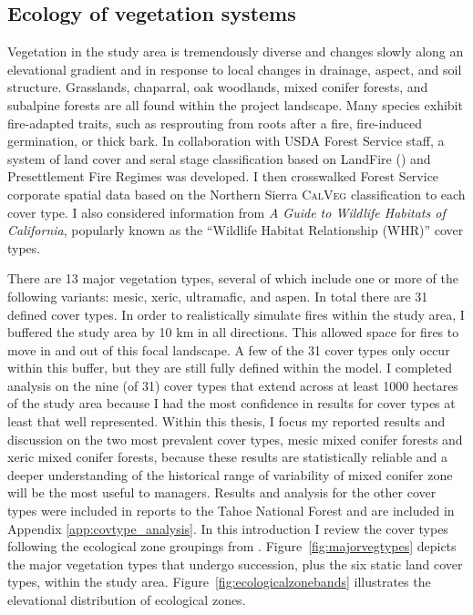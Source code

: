 \subsection{Ecology of vegetation systems}
Vegetation in the study area is tremendously diverse and changes slowly along an elevational gradient and in response to local changes in drainage, aspect, and soil structure. Grasslands, chaparral, oak woodlands, mixed conifer forests, and subalpine forests are all found within the project landscape. Many species exhibit fire-adapted traits, such as resprouting from roots after a fire, fire-induced germination, or thick bark. In collaboration with USDA Forest Service staff, a system of land cover and seral stage classification based on LandFire (\mbox{}) and \citet[]['s]{VandeWater2011} Presettlement Fire Regimes was developed. I then crosswalked Forest Service corporate spatial data based on the Northern Sierra \textsc{CalVeg} classification to each cover type. I also considered information from \emph{A Guide to Wildlife Habitats of California}, popularly known as the ``Wildlife Habitat Relationship (WHR)'' cover types. 

There are 13 major vegetation types, several of which include one or more of the following variants: mesic, xeric, ultramafic, and aspen. In total there are 31 defined cover types. In order to realistically simulate fires within the study area, I buffered the study area by 10 km in all directions. This allowed space for fires to move in and out of this focal landscape. A few of the 31 cover types only occur within this buffer, but they are still fully defined within the model. I completed analysis on the nine (of 31) cover types that extend across at least 1000 hectares of the study area because I had the most confidence in results for cover types at least that well represented. Within this thesis, I focus my reported results and discussion on the two most prevalent cover types, mesic mixed conifer forests and xeric mixed conifer forests, because these results are statistically reliable and a deeper understanding of the historical range of variability of mixed conifer zone will be the most useful to managers. Results and analysis for the other cover types were included in reports to the Tahoe National Forest and are included in Appendix \ref{app:covtype_analysis}. In this introduction I review the cover types following the ecological zone groupings from \citet{VanWag2006}. Figure~\ref{fig:majorvegtypes}  depicts the major vegetation types that undergo succession, plus the six static land cover types, within the study area. Figure~\ref{fig:ecologicalzonebands} illustrates the elevational distribution of ecological zones.

